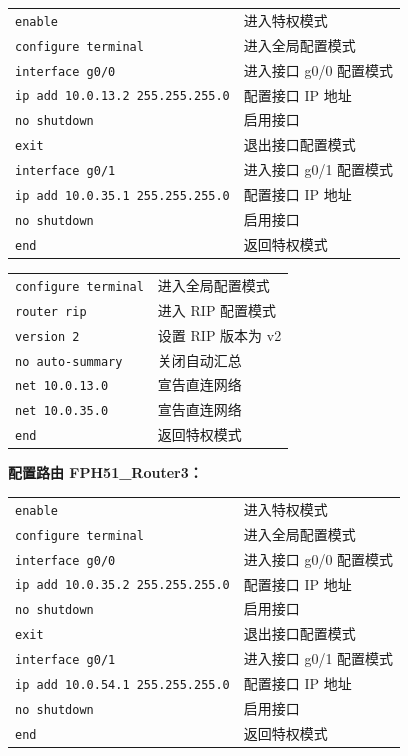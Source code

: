 \documentclass[UTF8,12pt,a4paper]{ctexart}
\begin{document}
\medskip
\begin{tabular}{p{7cm} p{7cm}}
\texttt{enable} & 进入特权模式 \\
\texttt{configure terminal} & 进入全局配置模式 \\

\texttt{interface g0/0} & 进入接口 g0/0 配置模式 \\
\texttt{ip add 10.0.13.2 255.255.255.0} & 配置接口 IP 地址 \\
\texttt{no shutdown} & 启用接口 \\
\texttt{exit} & 退出接口配置模式 \\

\texttt{interface g0/1} & 进入接口 g0/1 配置模式 \\
\texttt{ip add 10.0.35.1 255.255.255.0} & 配置接口 IP 地址 \\
\texttt{no shutdown} & 启用接口 \\

\texttt{end} & 返回特权模式 \\
\end{tabular}

\bigskip
\begin{tabular}{p{7cm} p{7cm}}
\texttt{configure terminal} & 进入全局配置模式 \\
\texttt{router rip} & 进入 RIP 配置模式 \\
\texttt{version 2} & 设置 RIP 版本为 v2 \\
\texttt{no auto-summary} & 关闭自动汇总 \\
\texttt{net 10.0.13.0} & 宣告直连网络 \\
\texttt{net 10.0.35.0} & 宣告直连网络 \\
\texttt{end} & 返回特权模式 \\
\end{tabular}

\bigskip
\noindent\textbf{配置路由 FPH51\_Router3：}

\medskip
\begin{tabular}{p{7cm} p{7cm}}
\texttt{enable} & 进入特权模式 \\
\texttt{configure terminal} & 进入全局配置模式 \\

\texttt{interface g0/0} & 进入接口 g0/0 配置模式 \\
\texttt{ip add 10.0.35.2 255.255.255.0} & 配置接口 IP 地址 \\
\texttt{no shutdown} & 启用接口 \\
\texttt{exit} & 退出接口配置模式 \\

\texttt{interface g0/1} & 进入接口 g0/1 配置模式 \\
\texttt{ip add 10.0.54.1 255.255.255.0} & 配置接口 IP 地址 \\
\texttt{no shutdown} & 启用接口 \\

\texttt{end} & 返回特权模式 \\
\end{tabular}
\end{document}

